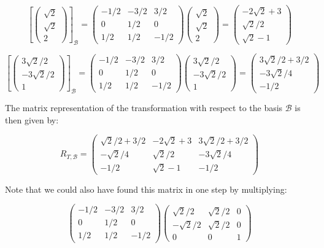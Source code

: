 \documentclass[11pt]{article}
\begin{document}
$$\left[\begin{pmatrix}
\sqrt{2} \\ \sqrt{2} \\ 2
\end{pmatrix}\right]_{\mathcal{B}} = 
\begin{pmatrix}
-1/2&-3/2&3/2\\0&1/2&0\\1/2&1/2&-1/2
\end{pmatrix}\begin{pmatrix}
\sqrt{2} \\ \sqrt{2} \\ 2
\end{pmatrix} = \begin{pmatrix}
-2\sqrt{2}+3 \\ \sqrt{2}/2 \\ \sqrt{2} - 1
\end{pmatrix}$$

$$\left[\begin{pmatrix}
3\sqrt{2}/2 \\ -3\sqrt{2}/2 \\ 1
\end{pmatrix}\right]_{\mathcal{B}} = 
\begin{pmatrix}
-1/2&-3/2&3/2\\0&1/2&0\\1/2&1/2&-1/2
\end{pmatrix}\begin{pmatrix}
3\sqrt{2}/2 \\ -3\sqrt{2}/2 \\ 1
\end{pmatrix} = \begin{pmatrix}
3\sqrt{2}/2 + 3/2 \\ -3\sqrt{2}/4 \\ -1/2
\end{pmatrix}$$

The matrix representation of the transformation with respect to the basis $\mathcal{B}$ is then given by:

$$R_{T,\mathcal{B}} = \begin{pmatrix}
\sqrt{2}/2+3/2 & -2\sqrt{2}+3& 3\sqrt{2}/2 +3/2\\ -\sqrt{2}/4 & \sqrt{2}/2 &-3\sqrt{2}/4 \\ -1/2 & \sqrt{2}-1 &-1/2
\end{pmatrix}$$

Note that we could also have found this matrix in one step by multiplying:

$$ \begin{pmatrix}
-1/2&-3/2&3/2\\0&1/2&0\\1/2&1/2&-1/2
\end{pmatrix}
\begin{pmatrix}
\sqrt{2}/2 &\sqrt{2}/2 &0 \\ -\sqrt{2}/2 & \sqrt{2}/2 & 0\\ 0&0&1
\end{pmatrix}$$
\end{document}

